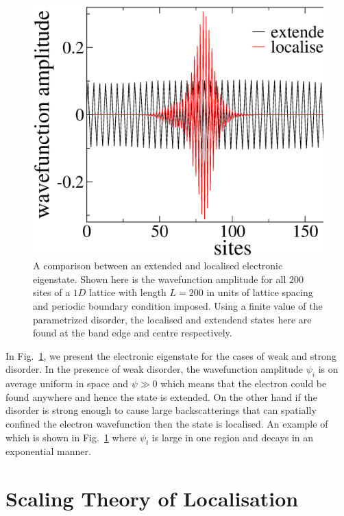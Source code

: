 %
\begin{figure}
  \includegraphics[width=\figwidth]{extendedVSloc.eps}
   \caption[A comparison between an extended and localised electronic eigenstate.]{ A comparison between an extended and localised electronic eigenstate.  Shown here is the wavefunction amplitude for all $200$ sites of a $1D$ lattice with length $L=200$ in units of lattice spacing and periodic boundary condition imposed.  Using a finite value of the parametrized disorder, the localised and extendend states here are found at the band edge and centre respectively.}
\label{fig-extVSloc}
\end{figure}
%
In Fig.~\ref{fig-extVSloc}, we present the electronic eigenstate for the cases of weak and strong disorder.  In the presence of weak disorder, the wavefunction amplitude $\psi_i$ is on average uniform in space and $\psi \gg 0$ which means that the electron could be found anywhere and hence the state is extended.  On the other hand if the disorder is strong enough to cause large backscatterings that can spatially confined the electron wavefunction then the state is localised.  An example of which is shown in Fig.~\ref{fig-extVSloc} where $\psi_i$ is large in one region and decays in an exponential manner.

\section{Scaling Theory of Localisation}
\label{sec-SCALING}

